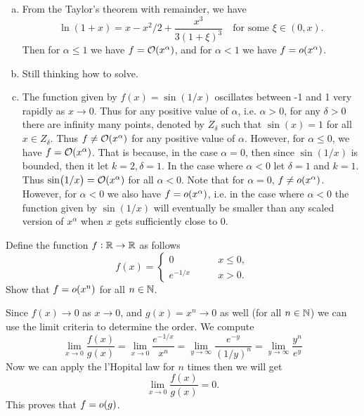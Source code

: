 \begin{solution}
\begin{enumerate}[(a)]
		\item From the Taylor's theorem with remainder, we have 
		\[ \ln(1+x) = x - x^2/2 + \frac{x^3}{3(1+\xi)^3}\quad \text{for some } \xi \in (0,x). \]
		Then for $ \alpha \leq 1 $ we have $ f=\mathcal{O}(x^\alpha) $, and for $ \alpha < 1 $ we have $ f = o(x^\alpha) $.
		
		\item Still thinking how to solve.
		
		\item The function given by $ f(x) = \sin(1/x) $ oscillates between -1 and 1 very rapidly as $ x\to 0 $. Thus for any positive value of $ \alpha $, i.e. $ \alpha > 0 $, for any $ \delta >0 $ there are infinity many points, denoted by $ Z_\delta $ such that $ \sin(x) = 1 $ for all $ x\in Z_\delta $. Thus $ f\neq \mathcal{O}(x^\alpha) $ for any positive value of $ \alpha $. However, for $ \alpha \leq 0 $, we have $ f = \mathcal{O}(x^\alpha) $. That is because, in the case $ \alpha = 0 $, then since $ \sin(1/x) $ is bounded, then it let $ k = 2, \delta =1 $. In the case where $ \alpha < 0 $ let $ \delta = 1 $ and $ k=1 $. Thus $ \sin(1/x)  = \mathcal{O}(x^\alpha) $ for all $ \alpha< 0 $. Note that for $ \alpha = 0 $, $ f \neq o(x^\alpha) $.  However, for $ \alpha < 0 $ we also have $ f = o(x^\alpha) $, i.e. in the case where $ \alpha < 0 $ the function given by $ \sin(1/x) $ will eventually be smaller than any scaled version of $ x^\alpha $ when $ x $ gets sufficiently close to 0. 
	\end{enumerate}
\end{solution}


\begin{problem}
	Define the function $ f:\mathbb{R} \to \mathbb{R} $ as follows
	\[ f(x) = \begin{cases}
		0 \qquad &x\leq 0,\\
		e^{-1/x} \qquad &x > 0.
	\end{cases} \]
	Show that $ f = o(x^n) $ for all $ n \in \mathbb{N} $.
\end{problem}
\begin{solution}
	Since $ f(x) \to 0 $ as $ x \to 0 $, and $ g(x) = x^n \to 0$ as well (for all $ n \in \mathbb{N} $) we can use the limit criteria to determine the order. We compute
	\[ \lim_{x\to 0}\frac{f(x)}{g(x)} = \lim_{x\to 0}\frac{e^{-1/x}}{x^n} = \lim_{y \to \infty} \frac{e^{-y}}{(1/y)^n} = \lim_{y\to \infty} \frac{y^n}{e^y}\]
	Now we can apply the l'Hopital law for $ n $ times then we will get
	\[ \lim_{x\to 0}\frac{f(x)}{g(x)} = 0. \]
	This proves that $ f = o(g) $.
\end{solution}